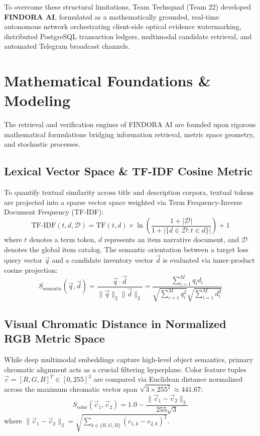\documentclass[conference]{IEEEtran}
\begin{document}
To overcome these structural limitations, Team Techsquad (Team 22) developed \textbf{FINDORA AI}, formulated as a mathematically grounded, real-time autonomous network orchestrating client-side optical evidence watermarking, distributed PostgreSQL transaction ledgers, multimodal candidate retrieval, and automated Telegram broadcast channels.

\section{Mathematical Foundations \& Modeling}

The retrieval and verification engines of FINDORA AI are founded upon rigorous mathematical formulations bridging information retrieval, metric space geometry, and stochastic processes.

\subsection{Lexical Vector Space \& TF-IDF Cosine Metric}
To quantify textual similarity across title and description corpora, textual tokens are projected into a sparse vector space weighted via Term Frequency-Inverse Document Frequency (TF-IDF):
\begin{equation}
    \text{TF-IDF}(t, d, \mathcal{D}) = \text{TF}(t, d) \times \ln\left(\frac{1 + |\mathcal{D}|}{1 + |\{d \in \mathcal{D} : t \in d\}|}\right) + 1
\end{equation}
where $t$ denotes a term token, $d$ represents an item narrative document, and $\mathcal{D}$ denotes the global item catalog. The semantic orientation between a target loss query vector $\vec{q}$ and a candidate inventory vector $\vec{d}$ is evaluated via inner-product cosine projection:
\begin{equation}
    S_{\text{semantic}}(\vec{q}, \vec{d}) = \frac{\vec{q} \cdot \vec{d}}{\|\vec{q}\|_2 \|\vec{d}\|_2} = \frac{\sum_{i=1}^M q_i d_i}{\sqrt{\sum_{i=1}^M q_i^2} \sqrt{\sum_{i=1}^M d_i^2}}
\end{equation}

\subsection{Visual Chromatic Distance in Normalized RGB Metric Space}
While deep multimodal embeddings capture high-level object semantics, primary chromatic alignment acts as a crucial filtering hyperplane. Color feature tuples $\vec{c} = [R, G, B]^T \in [0, 255]^3$ are compared via Euclidean distance normalized across the maximum chromatic vector span $\sqrt{3 \times 255^2} \approx 441.67$:
\begin{equation}
    S_{\text{color}}(\vec{c}_1, \vec{c}_2) = 1.0 - \frac{\|\vec{c}_1 - \vec{c}_2\|_2}{255\sqrt{3}}
\end{equation}
where $\|\vec{c}_1 - \vec{c}_2\|_2 = \sqrt{\sum_{k \in \{R,G,B\}} (c_{1,k} - c_{2,k})^2}$.
\end{document}
